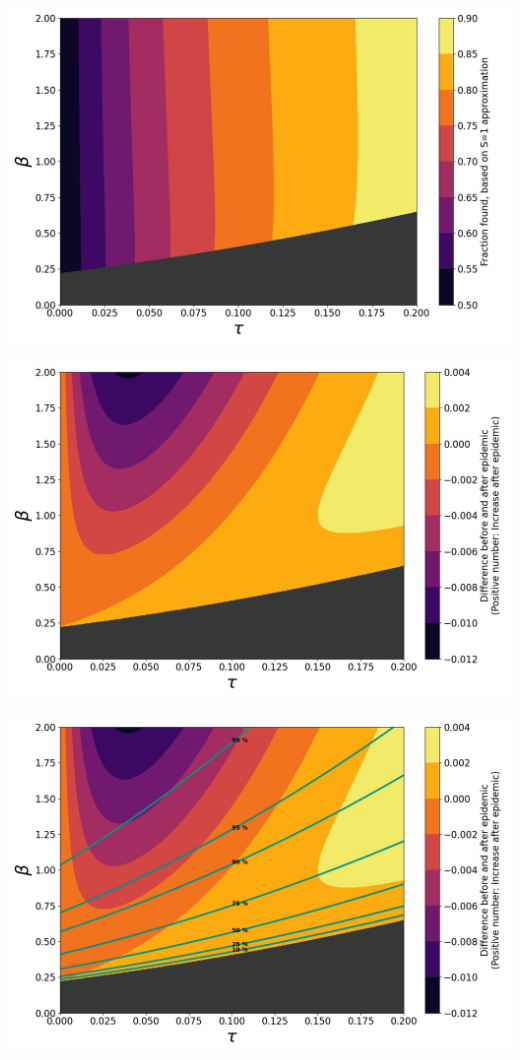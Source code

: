 \documentclass[10pt,a4paper,landscape]{article}
\begin{document}
\includegraphics[width=0.98\linewidth]{TestIntensity_RatioBefore.png}

\includegraphics[width=0.98\linewidth]{TestIntensity_RatioDifference.png}

\includegraphics[width=0.98\linewidth]{TestIntensity_RatioDifferenceLines.png}
\end{document}
